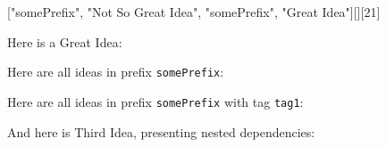 \documentclass[11pt]{article}
\begin{document}
[{"somePrefix", "Not So Great Idea"}, {"somePrefix", "Great Idea"}][][21]

\par Here is a Great Idea:
\vspace{1em}
\par Here are all ideas in prefix \texttt{somePrefix}:
\printAllWithPrefix[somePrefix][lcf]
\vspace{1em}
\par Here are all ideas in prefix \texttt{somePrefix} with tag \texttt{tag1}:
\vspace{1em}
\par And here is Third Idea, presenting nested dependencies:
\end{document}
